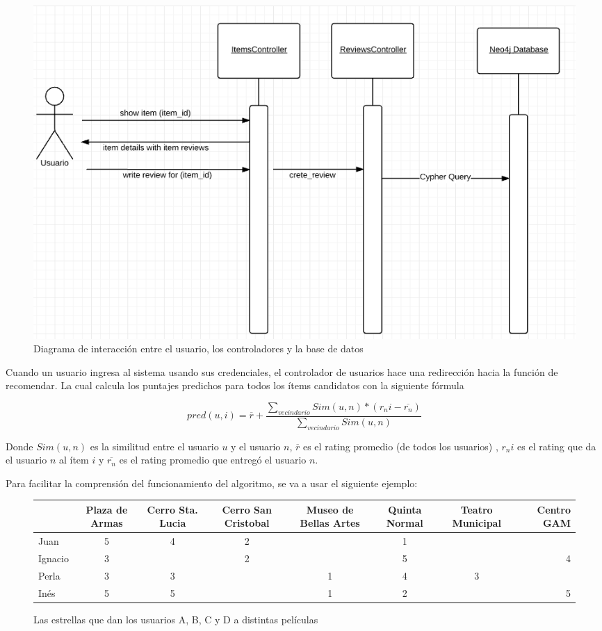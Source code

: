 \begin{figure}[hbtp]
\centering
\includegraphics[scale=0.8]{images/review_history.png}
\caption{Diagrama de interacción entre el usuario, los controladores y la base de datos}
\end{figure}

Cuando un usuario ingresa al sistema usando sus credenciales, el controlador de usuarios hace una redirección hacia la función de recomendar. La cual calcula los puntajes predichos para todos los ítems candidatos con la siguiente fórmula 

\begin{equation}
pred(u,i) = \overline{r} + \frac{\sum\limits_{vecindario} Sim(u,n) * (r_ni - \overline{r_n} )}{\sum\limits_{vecindario} Sim(u,n)}
\end{equation}

Donde $Sim(u,n)$ es la similitud entre el usuario $u$ y el usuario $n$, $\overline{r}$ es el rating promedio (de todos los usuarios) , $r_ni$ es el rating que da el usuario $n$ al ítem $i$ y $\overline{r_n}$ es el rating promedio que entregó el usuario $n$. 

Para facilitar la comprensión del funcionamiento del algoritmo, se va a usar el siguiente ejemplo:

\begin{figure}
\centering
\begin{adjustbox}{max width=\textwidth}
\begin{tabular}{l*{6}{c}r}
                  & Plaza de Armas & Cerro Sta. Lucia & Cerro San Cristobal & Museo de Bellas Artes & Quinta Normal  & Teatro Municipal & Centro GAM \\
\hline
Juan          & 5 & 4 & 2 &   & 1 &   &   \\
\hline
Ignacio       & 3 &   & 2 &   & 5 &   & 4 \\
\hline
Perla         & 3 & 3 &   & 1 & 4 & 3 &   \\
\hline
Inés          & 5 & 5 &   & 1 & 2 &   & 5 \\


\end{tabular}
\end{adjustbox}
\caption{Las estrellas que dan los usuarios A, B, C y D a distintas películas}

\end{figure}

